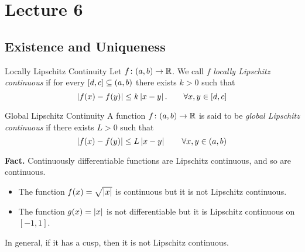\documentclass[class=article, crop=false]{standalone}
\begin{document}
  \section{Lecture 6}
  \subsection{Existence and Uniqueness}
  \begin{definition}{Locally Lipschitz Continuity}
    Let $f\colon (a, b)\to \mathbb{R}$. We call $f$ \emph{locally Lipschitz continuous} if for every $[d, c]\subseteq (a, b)$ there exists $k > 0$ such that
    \[
      \left\lvert f(x) - f(y) \right\rvert \leq k \left\lvert x - y \right\rvert. \tag*{$\forall x, y\in [d, c]$}
    \]
  \end{definition}
  \begin{definition}{Global Lipschitz Continuity}
    A function $f\colon (a, b)\to \mathbb{R}$ is said to be \emph{global Lipschitz continuous} if there exists $L > 0$ such that
    \[
      \left\lvert f(x) - f(y) \right\rvert\leq L\left\lvert x - y \right\rvert\tag*{$\forall x,y\in(a, b)$}
    \]
  \end{definition}
  \textbf{Fact.} Continuously differentiable functions are Lipschitz continuous, and so are continuous.
  \begin{example}{}
    \begin{itemize}
      \item The function $f(x) = \sqrt{\left\lvert x \right\rvert}$ is continuous but it is not Lipschitz continuous.
      \item The function $g(x) = \left\lvert x \right\rvert$ is not differentiable but it is Lipschitz continuous on $[-1, 1]$.
    \end{itemize}
  \end{example}
  \begin{note}{}
    In general, if it has a cusp, then it is not Lipschitz continuous.
  \end{note}
\end{document}

